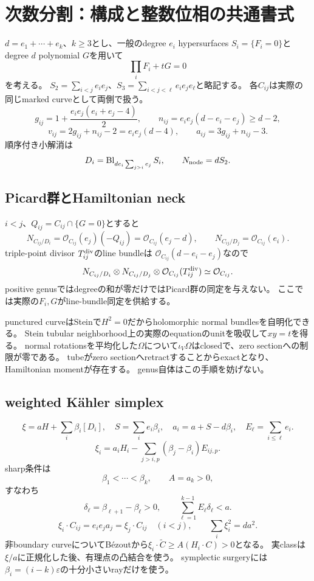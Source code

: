 \documentclass[11pt,a4paper]{article}
\begin{document}
\section{次数分割：構成と整数位相の共通書式}

$d=e_1+\cdots+e_k$、$k\ge3$とし、一般のdegree $e_i$ hypersurfaces $S_i=\{F_i=0\}$とdegree $d$ polynomial $G$を用いて
\[
 \prod_iF_i+tG=0
\]
を考える。
$S_2=\sum_{i<j}e_ie_j$、$S_3=\sum_{i<j<\ell}e_ie_je_\ell$と略記する。
各$C_{ij}$は実際の同じmarked curveとして両側で扱う。
\[
 g_{ij}=1+\frac{e_ie_j(e_i+e_j-4)}2,\qquad
 n_{ij}=e_ie_j(d-e_i-e_j)\ge d-2,
\]
\[
 v_{ij}=2g_{ij}+n_{ij}-2=e_ie_j(d-4),\qquad
 a_{ij}=3g_{ij}+n_{ij}-3.
\]
順序付き小解消は
\[
 D_i=\operatorname{Bl}_{d e_i\sum_{j>i}e_j}S_i,\qquad
 N_{\rm node}=dS_2.
\]

\subsection{Picard群とHamiltonian neck}

$i<j$、$Q_{ij}=C_{ij}\cap\{G=0\}$とすると
\[
 N_{C_{ij}/D_i}=\mathcal O_{C_{ij}}(e_j)(-Q_{ij})
 =\mathcal O_{C_{ij}}(e_j-d),\qquad
 N_{C_{ij}/D_j}=\mathcal O_{C_{ij}}(e_i).
\]
triple-point divisor $T_{ij}^{\rm div}$のline bundleは
$\mathcal O_{C_{ij}}(d-e_i-e_j)$なので
\[
 N_{C_{ij}/D_i}\otimes N_{C_{ij}/D_j}
 \otimes\mathcal O_{C_{ij}}(T_{ij}^{\rm div})\simeq\mathcal O_{C_{ij}}.
\]
positive genusではdegreeの和が零だけではPicard群の同定を与えない。
ここでは実際の$F_i,G$がline-bundle同定を供給する。

punctured curveはSteinで$H^2=0$だからholomorphic normal bundlesを自明化できる。
Stein tubular neighborhood上の実際のequationのunitを吸収して$xy=t$を得る。
normal rotationsを平均化した$\Omega$について$\iota_V\Omega$はclosedで、zero sectionへの制限が零である。
tubeがzero sectionへretractすることからexactとなり、Hamiltonian momentが存在する。
genus自体はこの手順を妨げない。

\subsection{weighted Kähler simplex}

\[
 \xi=aH+\sum_i\beta_i[D_i],\quad
 S=\sum_i e_i\beta_i,\quad a_i=a+S-d\beta_i,\quad
 E_\ell=\sum_{i\le\ell}e_i.
\]
\[
 \xi_i=a_iH_i-\sum_{j>i,p}(\beta_j-\beta_i)E_{ij,p}.
\]
sharp条件は
\[
 \beta_1<\cdots<\beta_k,\qquad A=a_k>0,
\]
すなわち
\[
 \delta_\ell=\beta_{\ell+1}-\beta_\ell>0,\qquad
 \sum_{\ell=1}^{k-1}E_\ell\delta_\ell<a.
\]
\[
 \xi_i\cdot C_{ij}=e_ie_j a_j=\xi_j\cdot C_{ij}\quad(i<j),
 \qquad \sum_i\xi_i^2=da^2.
\]
非boundary curveについてBézoutから$\xi_i\cdot\widetilde C\ge A(H_i\cdot C)>0$となる。
実classは$\xi/a$に正規化した後、有理点の凸結合を使う。
symplectic surgeryには$\beta_i=(i-k)\varepsilon$の十分小さいrayだけを使う。
\end{document}
